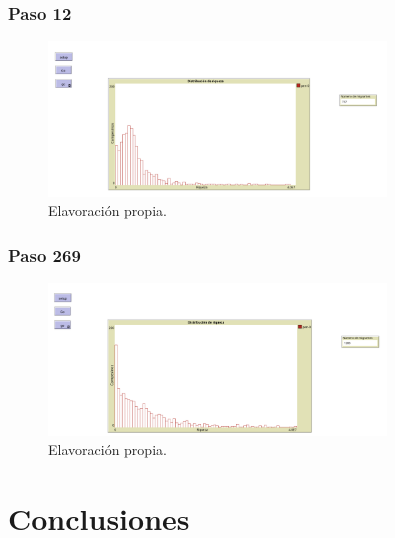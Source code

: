 \documentclass[17pt, t, lualatex]{beamer}
\begin{document}
\begin{frame}
  \frametitle{Paso 12}
  \begin{figure}[ht]
    \centering
    \includegraphics[width = 0.8\textwidth]{img/img7.png}
    \caption{Elavoración propia.}
  \end{figure}
\end{frame}


\begin{frame}
  \frametitle{Paso 269}
  \begin{figure}[ht]
    \centering
    \includegraphics[width = 0.8\textwidth]{img/img8.png}
    \caption{Elavoración propia.}
  \end{figure}
\end{frame}




\section{Conclusiones}

\insertsectionpage
\end{document}
